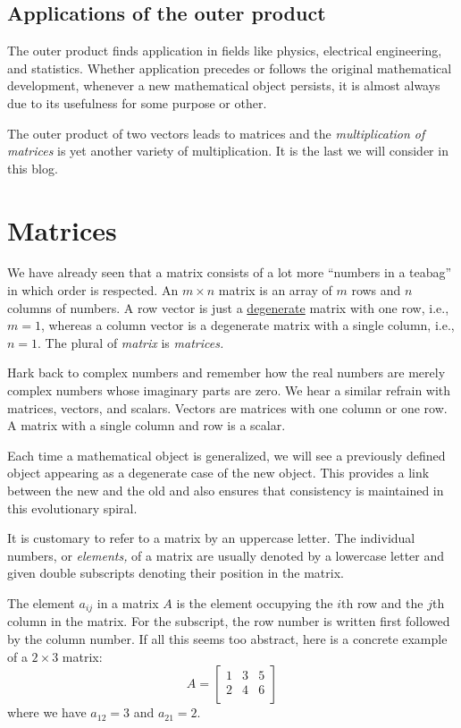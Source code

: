 \documentclass[
  a4paper,
]{article}
\begin{document}
\hypertarget{applications-of-the-outer-product}{%
\subsection{Applications of the outer
product}\label{applications-of-the-outer-product}}

The outer product finds application in fields like physics, electrical
engineering, and statistics. Whether application precedes or follows the
original mathematical development, whenever a new mathematical object
persists, it is almost always due to its usefulness for some purpose or
other.

The outer product of two vectors leads to matrices and the
\emph{multiplication of matrices} is yet another variety of
multiplication. It is the last we will consider in this blog.

\hypertarget{matrices}{%
\section{Matrices}\label{matrices}}

We have already seen that a matrix consists of a lot more ``numbers in a
teabag'' in which order is respected. An \(m \times n\) matrix is an
array of \(m\) rows and \(n\) columns of numbers. A row vector is just a
\href{http://en.wikipedia.org/wiki/Degenerate_\%28mathematics\%29}{degenerate}
matrix with one row, i.e., \(m = 1\), whereas a column vector is a
degenerate matrix with a single column, i.e., \(n = 1\). The plural of
\emph{matrix} is \emph{matrices.}

Hark back to complex numbers and remember how the real numbers are
merely complex numbers whose imaginary parts are zero. We hear a similar
refrain with matrices, vectors, and scalars. Vectors are matrices with
one column or one row. A matrix with a single column and row is a
scalar.

Each time a mathematical object is generalized, we will see a previously
defined object appearing as a degenerate case of the new object. This
provides a link between the new and the old and also ensures that
consistency is maintained in this evolutionary spiral.

It is customary to refer to a matrix by an uppercase letter. The
individual numbers, or \emph{elements,} of a matrix are usually denoted
by a lowercase letter and given double subscripts denoting their
position in the matrix.

The element \(a_{ij}\) in a matrix \(A\) is the element occupying the
\(i\)th row and the \(j\)th column in the matrix. For the subscript, the
row number is written first followed by the column number. If all this
seems too abstract, here is a concrete example of a \(2 \times 3\)
matrix: \[
A = \left[
\begin{matrix}
1 & 3 & 5\\
2 & 4 & 6\\
\end{matrix}
\right]
\] where we have \(a_{12} = 3\) and \(a_{21} = 2.\)
\end{document}
